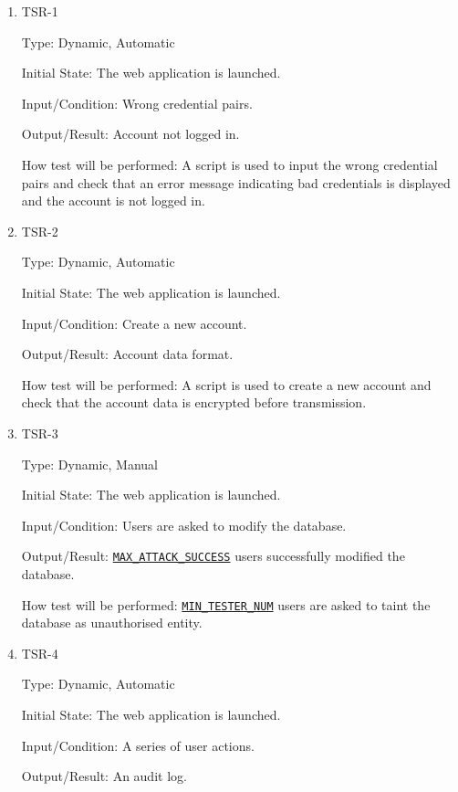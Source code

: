 \documentclass[12pt, titlepage]{article}
\begin{document}
\begin{enumerate}
\item{TSR-1\\}\label{TSR-1}

Type: Dynamic, Automatic
					
Initial State: The web application is launched.
					
Input/Condition: Wrong credential pairs.
					
Output/Result: Account not logged in.
					
How test will be performed: A script is used to input the wrong credential pairs and check that an error message indicating bad credentials is displayed and the account is not logged in.

\item{TSR-2\\}\label{TSR-2}

Type: Dynamic, Automatic
					
Initial State: The web application is launched.
					
Input/Condition: Create a new account.
					
Output/Result: Account data format.
					
How test will be performed: A script is used to create a new account and check that the account data is encrypted before transmission.

\item{TSR-3\\}\label{TSR-3}

Type: Dynamic, Manual
					
Initial State: The web application is launched.
					
Input/Condition: Users are asked to modify the database.
					
Output/Result: \hyperref[MAX_ATTACK_SUCCESS]{\texttt{MAX\_ATTACK\_SUCCESS}} users successfully modified the database.
					
How test will be performed: \hyperref[MIN_TESTER_NUM]{\texttt{MIN\_TESTER\_NUM}} users are asked to taint the database as unauthorised entity.

\item{TSR-4\\}\label{TSR-4}

Type: Dynamic, Automatic
					
Initial State: The web application is launched.
					
Input/Condition: A series of user actions.
					
Output/Result: An audit log.
					

\end{enumerate}
\end{document}
